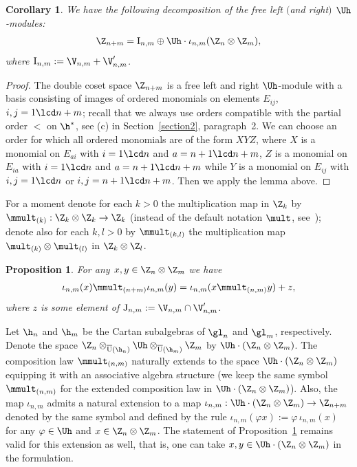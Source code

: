 \documentclass[pdftex]{sigma}
\newtheorem{prop}[theorem]{Proposition}
\newtheorem{cor}[theorem]{Corollary}
\numberwithin{equation}{section}
\begin{document}
\begin{cor}\label{corollary1}
We have the following decomposition of the free left $($and right$)$ $\Uh$-modules:
\begin{gather}\label{st4}
\Z_{n+m}= \mathrm{I}_{n,m}\oplus \Uh\cdot\iota_{n,m}(\Z_n\otimes\Z_m)   ,
\end{gather}
where $\mathrm{I}_{n,m}:=\V_{n,m}+\V'_{n,m}$.
\end{cor}

\begin{proof} The double coset space $\Z_{n+m}$ is a free left and right $\Uh$-module with a basis consisting of images of ordered monomials on elements
$E_{ij}$, $i,j=1\lcd n+m$; recall that we always use orders compatible with the partial order $<$ on $\h^*$, see (c) in Section~\ref{section2},
paragraph~2. We can choose an order for which all ordered monomials are of the form $XYZ$, where $X$ is a monomial on $E_{ai}$ with
$i=1\lcd n$ and $a=n+1\lcd n+m$, $Z$ is a monomial on $E_{ia}$  with $i=1\lcd n$ and $a=n+1\lcd n+m$ while $Y$ is a monomial on
$E_{ij}$ with $i,j=1\lcd n$ or $i,j=n+1\lcd n+m$. Then we apply the lemma above.
\end{proof}


For a moment denote for each $k>0$ the multiplication map in $\Z_k$ by $\mmult_{(k)}:\Z_k\otimes\Z_k\to\Z_k$  (instead of the default notation $\mult$,
see~); denote also for each $k,l>0$ by $\mmult_{(k,l)}$ the multiplication map $\mult_{(k)}\otimes \mult_{(l)}$ in $\Z_k\otimes \Z_l$.

\begin{prop}
\label{proposition1}
For any $x,y\in  \Z_n\otimes\Z_m$ we have
\begin{gather*}%
\iota_{n,m}(x)\mmult_{(n+m)}\iota_{n,m}(y) = \iota_{n,m}(x\mmult_{(n,m)}y)+ z  ,
\end{gather*}
where $z$ is some element of $\mathrm{J}_{n,m}:=\V_{n,m}\cap\V'_{n,m}$.
\end{prop}

Let $\h_n$ and $\h_m$ be the Cartan subalgebras of $\gl_n$ and $\gl_m$, respectively. Denote the space
$\Z_n\otimes_{\overline{\mathrm{U}}(\h_n)}\Uh\otimes_{\overline{\mathrm{U}}(\h_m)}\Z_m$ by $\Uh\cdot\left(\Z_n\otimes\Z_m\right)$. The composition law
$\mmult_{(n,m)}$ naturally extends to the space $\Uh\cdot\left(\Z_n\otimes\Z_m\right)$ equipping it with an associative algebra structure (we keep the
same symbol $\mmult_{(n,m)}$ for the extended composition law in $\Uh\cdot\left(\Z_n\otimes\Z_m\right)$). Also, the map $\iota_{n,m}$ admits a natural
extension to a map $\iota_{n,m} : \Uh\cdot\left(\Z_n\otimes\Z_m\right)\to\Z_{n+m}$ denoted by the same symbol and def\/ined by the rule
$\iota_{n,m}(\varphi x):=\varphi\,\iota_{n,m}(x)$ for any $\varphi\in\Uh$ and $x\in \Z_n\otimes\Z_m$. The statement of Proposition~\ref{proposition1} remains
valid for this extension as well, that is, one can take $x,y\in\Uh\cdot\left(\Z_n\otimes\Z_m\right)$ in the formulation.
\end{document}
